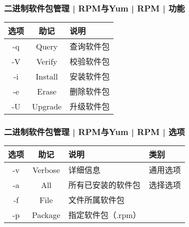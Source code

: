 \begin{frame}
  \frametitle{二进制软件包管理 | RPM与Yum | RPM | 功能}
  \begin{table}
    \centering
    \begin{tabularx}{0.6\textwidth}{ccX}
      \hline
      \rowcolor{blue!50}选项 & 助记 & 说明\\
      \hline
      -q & Query & 查询软件包\\
      -V & Verify & 校验软件包\\
      -i & Install & 安装软件包\\
      -e & Erase & 删除软件包\\
      -U & Upgrade & 升级软件包 \\
      \hline
    \end{tabularx}
  \end{table}
\end{frame}

\begin{frame}
  \frametitle{二进制软件包管理 | RPM与Yum | RPM | 选项}
  \begin{table}
    \centering
    \begin{tabularx}{\textwidth}{cclX}
      \hline
      \rowcolor{blue!50}选项 & 助记 & 说明 & 类别\\
      \hline
      -v & Verbose & 详细信息 & 通用选项\\
      \hline
      -a & All & 所有已安装的软件包 & 选择选项\\
      -f & File & 文件所属软件包 & \\
      -p & Package & 指定软件包（.rpm） & \\
      \hline
    \end{tabularx}
  \end{table}
\end{frame}

